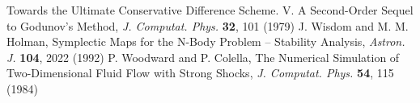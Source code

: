 \documentclass{cjour}
\begin{document}
\begin{article}
\begin{references}
                Towards the Ultimate Conservative Difference Scheme. 
                V. A Second-Order Sequel to Godunov's Method, 
                {\it J. Computat. Phys.} {\bf 32}, 101 (1979) 
 J. Wisdom and M. M. Holman, 
                Symplectic Maps for the N-Body Problem 
                -- Stability Analysis, 
                {\it Astron. J.} {\bf 104}, 2022 (1992)
 P. Woodward and P. Colella, 
                The Numerical Simulation of Two-Dimensional Fluid 
                Flow with Strong Shocks, 
                {\it J. Computat. Phys.} {\bf 54}, 115 (1984) 
\end{references}






\end{article}
\end{document}
